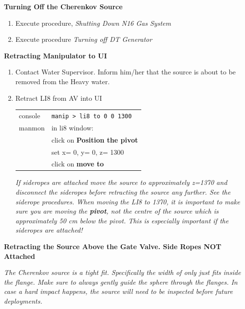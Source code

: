 {\bf Turning Off the Cherenkov Source}

\begin{enumerate}
\item \CheckBox[name=li8sd1]{} Execute procedure, {\it Shutting Down N16 Gas System}
\item \CheckBox[name=li8sd2]{} Execute procedure {\it Turning off DT Generator}
\end{enumerate}

{\bf Retracting Manipulator to UI}

\begin{enumerate}
\item \CheckBox[name=li8rmui1]{} Contact Water Supervisor. Inform him/her that the source is about to be removed from the Heavy water.
\item \CheckBox[name=li8rmui2]{} Retract LI8 from AV into UI
	\begin{center}
	\begin{tabular}{|l|l|}
	\hline
	console & \verb+manip > li8 to 0 0 1300+ \\
	manmon & in li8 window: \\
	& click on {\bf Position the pivot}\\
	& set x= 0, y= 0, z= 1300 \\
	& click on {\bf move to} \\
	\hline
	\end{tabular}
	\end{center}
{\it If sideropes are attached move the source to approximately z=1370 and disconnect the sideropes before retracting the source any further. See the siderope procedures. When moving the LI8 to 1370, it is important to make sure you are moving the {\bf pivot}, not the centre of the source which is approximately 50 cm below the pivot. This is especially important if the sideropes are attached!}
\end{enumerate}

{\bf Retracting the Source Above the Gate Valve. Side Ropes NOT Attached}

{\it The Cherenkov source is a tight fit. Specifically the width of
  only just fits inside the flange. Make sure to always gently guide
  the sphere through the flanges. In case a hard impact happens, the
  source will need to be inspected before future deployments.}

